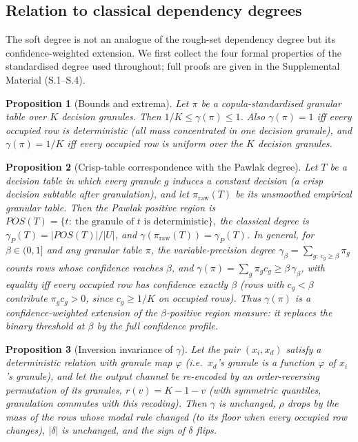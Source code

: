 \documentclass[11pt,a4paper]{article}
\newtheorem{proposition}{Proposition}
\begin{document}
\subsection{Relation to classical dependency degrees}\label{sec:grounding}
The soft degree is not an analogue of the rough-set dependency degree but
its confidence-weighted extension. We first collect the four formal
properties of the standardised degree used throughout; full proofs are
given in the Supplemental Material (S.1--S.4).

\begin{proposition}[Bounds and extrema]\label{prop:bounds}
Let $\pi$ be a copula-standardised granular table over $K$ decision granules.
Then $1/K \le \gamma(\pi) \le 1$. Also $\gamma(\pi)=1$ iff every occupied
row is deterministic (all mass concentrated in one decision granule), and
$\gamma(\pi)=1/K$ iff every occupied row is uniform over the $K$ decision
granules.
\end{proposition}

\begin{proposition}[Crisp-table correspondence with the Pawlak degree]
\label{prop:crisp}
Let $T$ be a decision table in which every granule $g$ induces a constant
decision (a crisp decision subtable after granulation), and let
$\pi_{\mathrm{raw}}(T)$ be its unsmoothed empirical granular table. Then the
Pawlak positive region is $POS(T)=\{t:\ \text{the granule of } t \text{ is
deterministic}\}$, the classical degree is
$\gamma_P(T)=|POS(T)|/|U|$, and $\gamma(\pi_{\mathrm{raw}}(T))=\gamma_P(T)$.
In general, for $\beta\in(0,1]$ and any granular table $\pi$, the
variable-precision degree
$\gamma_\beta=\sum_{g:\,c_g\ge\beta}\pi_g$ counts rows whose confidence
reaches $\beta$, and
$\gamma(\pi)=\sum_g \pi_g c_g \ge \beta\,\gamma_\beta$, with equality iff
every occupied row has confidence exactly $\beta$ (rows with $c_g<\beta$
contribute $\pi_g c_g>0$, since $c_g\ge 1/K$ on occupied rows). Thus
$\gamma(\pi)$ is a
confidence-weighted extension of the $\beta$-positive region measure: it
replaces the binary threshold at $\beta$ by the full confidence profile.
\end{proposition}

\begin{proposition}[Inversion invariance of $\gamma$]\label{prop:inv}
Let the pair $(x_i, x_d)$ satisfy a deterministic relation with granule map
$\varphi$ (i.e.\ $x_d$'s granule is a function $\varphi$ of $x_i$'s granule),
and let the output channel be re-encoded by an order-reversing permutation
of its granules, $r(v)=K-1-v$ (with symmetric quantiles, granulation
commutes with this recoding). Then $\gamma$ is unchanged, $\rho$ drops by
the mass of the rows whose modal rule changed (to its floor when every
occupied row changes), $|\delta|$ is unchanged, and the sign of $\delta$
flips.
\end{proposition}
\end{document}
